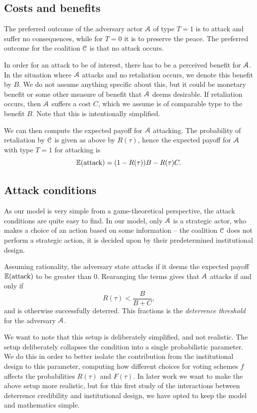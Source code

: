 \subsection{Costs and benefits}
The preferred outcome of the adversary actor $\EuScript{A}$ of type $T=1$ is to attack and suffer no consequences, while for $T=0$ it is to preserve the peace. The preferred outcome for the coalition $\EuScript{C}$ is that no attack occurs. 

In order for an attack to be of interest, there has to be a perceived benefit for $\EuScript{A}$. In the situation where $\EuScript{A}$ attacks and no retaliation occurs, we denote this benefit by $B$. We do not assume anything specific about this, but it could be monetary benefit or some other measure of benefit that $\EuScript{A}$ deems desirable. If retaliation occurs, then $\EuScript{A}$ suffers a cost $C$, which we assume is of comparable type to the benefit $B$. Note that this is intentionally simplified. 

We can then compute the expected payoff for $\EuScript{A}$ attacking. The probability of retaliation by $\EuScript{C}$ is given as above by $R(\tau)$, hence the expected payoff for $\EuScript{A}$ with type $T=1$ for attacking is 
\[\mathbb{E}(\mathrm{attack}) = (1-R(\tau))B-R(\tau)C.\]


\subsection{Attack conditions}
As our model is very simple from a game-theoretical perspective, the attack conditions are quite easy to find. In our model, only $\EuScript{A}$ is a strategic actor, who makes a choice of an action based on some information -- the coalition $\EuScript{C}$ does not perform a strategic action, it is decided upon by their predetermined institutional design. 

Assuming rationality, the adversary state attacks if it deems the expected payoff $\mathbb{E}(\mathrm{attack})$ to be greater than $0$. Rearanging the terms gives that $\EuScript{A}$ attacks if and only if
\[R(\tau)< \frac{B}{B+C},\]
and is otherwise successfully deterred. This fractions is the \emph{deterrence threshold} for the adversary $\EuScript{A}$. 

We want to note that this setup is deliberately simplified, and not realistic. The setup deliberately collapses the condition into a single probabilistic parameter. We do this in order to better isolate the contribution from the institutional design to this parameter, computing how different choices for voting schemes $f$ affects the probabilities $R(\tau)$ and $F(\tau)$. In later work we want to make the above setup more realistic, but for this first study of the interactions between deterrence credibility and institutional design, we have opted to keep the model and mathematics simple. 

